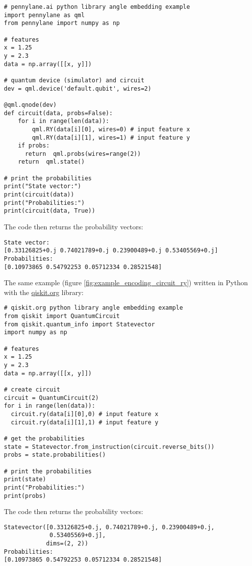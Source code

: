 \begin{verbatim}
# pennylane.ai python library angle embedding example
import pennylane as qml
from pennylane import numpy as np

# features
x = 1.25
y = 2.3
data = np.array([[x, y]])

# quantum device (simulator) and circuit
dev = qml.device('default.qubit', wires=2)

@qml.qnode(dev)
def circuit(data, probs=False):
    for i in range(len(data)):
        qml.RY(data[i][0], wires=0) # input feature x
        qml.RY(data[i][1], wires=1) # input feature y
    if probs:
      return  qml.probs(wires=range(2))
    return  qml.state()

# print the probabilities
print("State vector:")
print(circuit(data))
print("Probabilities:")
print(circuit(data, True))
\end{verbatim}

\noindent The code then returns the probability vectors:
\begin{verbatim}
State vector:
[0.33126825+0.j 0.74021789+0.j 0.23900489+0.j 0.53405569+0.j]
Probabilities:
[0.10973865 0.54792253 0.05712334 0.28521548]
\end{verbatim}

\newpage
\noindent The same example (figure \ref{fig:example_encoding_circuit_ry}) written in Python with the \href{https://qiskit.org/documentation/}{qiskit.org} library:

\begin{verbatim}
# qiskit.org python library angle embedding example
from qiskit import QuantumCircuit
from qiskit.quantum_info import Statevector
import numpy as np

# features
x = 1.25
y = 2.3
data = np.array([[x, y]])

# create circuit
circuit = QuantumCircuit(2)
for i in range(len(data)):
  circuit.ry(data[i][0],0) # input feature x
  circuit.ry(data[i][1],1) # input feature y

# get the probabilities
state = Statevector.from_instruction(circuit.reverse_bits())
probs = state.probabilities()

# print the probabilities
print(state)
print("Probabilities:")
print(probs)
\end{verbatim}

\noindent The code then returns the probability vectors:
\begin{verbatim}
Statevector([0.33126825+0.j, 0.74021789+0.j, 0.23900489+0.j,
             0.53405569+0.j],
            dims=(2, 2))
Probabilities:
[0.10973865 0.54792253 0.05712334 0.28521548]
\end{verbatim}

